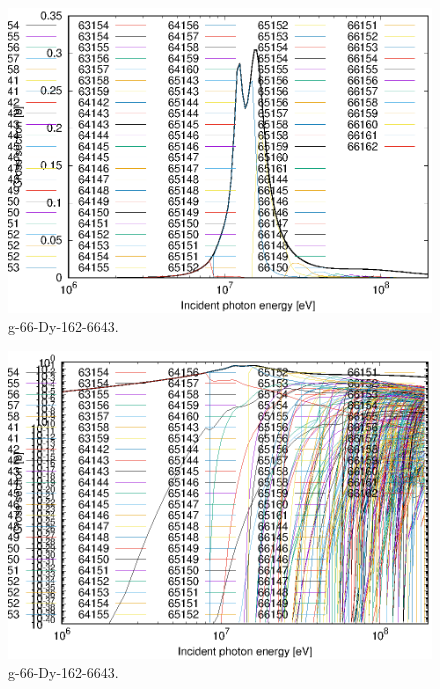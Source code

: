 \begin{figure}
 \includegraphics[width=\linewidth]{eps/g_66-Dy-162_6643.eps}
  \caption{g-66-Dy-162-6643.}
\end{figure}
\begin{figure}
 \includegraphics[width=\linewidth]{eps-log/g_66-Dy-162_6643.eps}
 \caption{g-66-Dy-162-6643.}
\end{figure}
\newpage \clearpage

